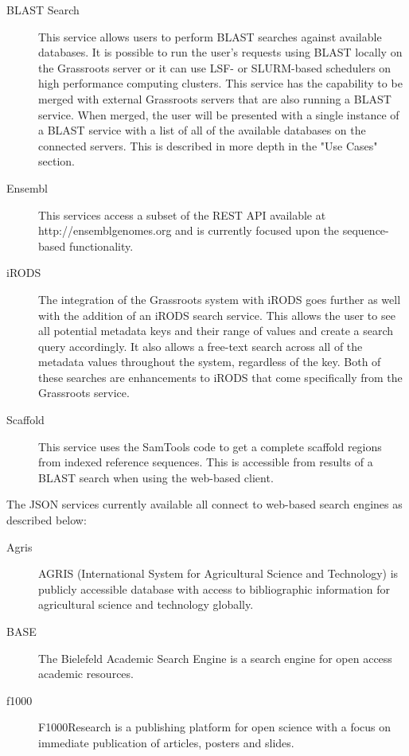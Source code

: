 \documentclass[9pt,a4paper]{extarticle}
\begin{document}
\begin{description}

\item [BLAST Search] This service allows users to perform BLAST searches against available databases.
It is possible to run the user's requests using BLAST locally on the Grassroots server or it can use LSF-\cite{lsf} or SLURM-based\cite{yoo2003slurm} schedulers on high performance computing clusters. 
This service has the capability to be merged with external Grassroots servers that are
also running a BLAST service. When merged, the user will be presented with a single instance of a BLAST
service with a list of all of the available databases on the connected servers. This is described in more depth in the "Use Cases" section. 


\item [Ensembl] This services access a subset of the REST API available at http://ensemblgenomes.org\cite{kersey2016ensembl} and is currently focused upon the sequence-based functionality.

\item [iRODS] The integration of the Grassroots system with iRODS goes further as well with the addition of an iRODS search service. 
This allows the user to see all potential metadata keys and their range of values and create a search query accordingly.
It also allows a free-text search across all of the metadata values throughout the system, regardless of the key. 
Both of these searches are enhancements to iRODS that come specifically from the Grassroots service.

\item [Scaffold] This service uses the SamTools\cite{li2009sequence} code to get a complete scaffold regions from indexed reference sequences. This is accessible from results of a BLAST search when using the web-based client.



\end{description}

The JSON services currently available all connect to web-based search engines as described below:

\begin{description}
\item [Agris] AGRIS\cite{Agris} (International System for Agricultural Science and Technology) is publicly accessible database with access to bibliographic information for agricultural science and technology globally.
\item [BASE] The Bielefeld Academic Search Engine\cite{Pieper2015} is a search engine for open access academic resources.
\item [f1000] F1000Research\cite{f1000} is a publishing platform for open science with a focus on immediate publication of articles, posters and slides.
\end{description}
\end{document}
